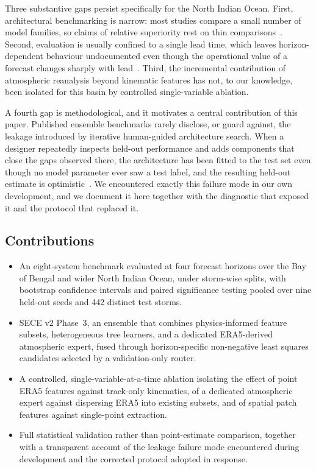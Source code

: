 \documentclass{ametsocv6.1}
\newcommand{\sece}{SECE}
\newcommand{\bob}{Bay of Bengal}
\newcommand{\era}{ERA5}
\begin{document}
Three substantive gaps persist specifically for the North Indian Ocean. First,
architectural benchmarking is narrow: most studies compare a small number of
model families, so claims of relative superiority rest on thin
comparisons~\citep{kar2021tropical,hossain2021track}. Second, evaluation is
usually confined to a single lead time, which leaves horizon-dependent behaviour
undocumented even though the operational value of a forecast changes sharply with
lead~\citep{kumar2024machine}. Third, the incremental contribution of atmospheric
reanalysis beyond kinematic features has not, to our knowledge, been isolated for
this basin by controlled single-variable ablation.

A fourth gap is methodological, and it motivates a central contribution of this
paper. Published ensemble benchmarks rarely disclose, or guard against, the
leakage introduced by iterative human-guided architecture search. When a designer
repeatedly inspects held-out performance and adds components that close the gaps
observed there, the architecture has been fitted to the test set even though no
model parameter ever saw a test label, and the resulting held-out estimate is
optimistic~\citep{cawley2010}. We encountered exactly this
failure mode in our own development, and we document it here together with the
diagnostic that exposed it and the protocol that replaced it.

\subsection{Contributions}
\begin{itemize}
\item An eight-system benchmark evaluated at four forecast horizons over the
\bob{} and wider North Indian Ocean, under storm-wise splits, with bootstrap
confidence intervals and paired significance testing pooled over nine held-out
seeds and 442 distinct test storms.

\item \sece{} v2 Phase~3, an ensemble that combines physics-informed feature
subsets, heterogeneous tree learners, and a dedicated \era{}-derived atmospheric
expert, fused through horizon-specific non-negative least squares candidates
selected by a validation-only router.

\item A controlled, single-variable-at-a-time ablation isolating the effect of
point \era{} features against track-only kinematics, of a dedicated atmospheric
expert against dispersing \era{} into existing subsets, and of spatial patch
features against single-point extraction.

\item Full statistical validation rather than point-estimate comparison, together
with a transparent account of the leakage failure mode encountered during
development and the corrected protocol adopted in response.
\end{itemize}
\end{document}

